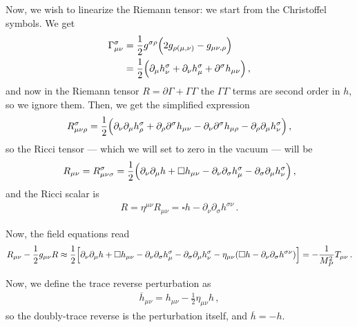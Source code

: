 \documentclass[main.tex]{subfiles}
\begin{document}
Now, we wish to linearize the Riemann tensor: we start from the Christoffel symbols. We get 
%
\begin{subequations}
\begin{align}
\Gamma^{\sigma }_{\mu \nu }
&= \frac{1}{2} g^{\sigma \rho }\qty(2g_{\rho (\mu , \nu )} - g_{\mu \nu , \rho })  \\
&= \frac{1}{2} \qty(\partial_{\mu } h^{\sigma }_{\nu } + \partial_{\nu } h^{\sigma }_{\mu } + \partial^{\sigma } h_{\mu \nu })
\,,
\end{align}
\end{subequations}
%
and now in the Riemann tensor \(R = \partial \Gamma + \Gamma \Gamma \) the \(\Gamma \Gamma \) terms are second order in \(h\), so we ignore them. Then, we get the simplified expression 
%
\begin{align}
R^{\sigma }_{\mu \nu \rho } = \frac{1}{2} 
\qty(\partial_{\nu } \partial_{\mu } 
h^{\sigma }_{\rho } 
+ \partial_{\rho } \partial^{\sigma }h_{\mu \nu }
- \partial_{\nu } \partial^{\sigma } h_{\mu \rho }
- \partial_{\rho } \partial_{\mu } h^{\sigma }_{\nu })
\,,
\end{align}
%
so the Ricci tensor --- which we will  set to zero in the vacuum --- will be 
%
\begin{align}
R_{\mu \nu }
= R^{\sigma }_{\mu \nu \sigma }
= \frac{1}{2} 
\qty(\partial_{\nu } \partial_{\mu } h + \square h_{\mu \nu } 
- \partial_{\nu } \partial_{\sigma } h^{\sigma }_{\mu }
- \partial_{\sigma} \partial_{\mu } h^{\sigma }_{\nu })
\,,
\end{align}
%
and the Ricci scalar is 
%
\begin{align}
R = \eta^{\mu \nu } R_{\mu \nu } 
= \square h - \partial_{\nu }\partial_{\sigma } h^{\sigma \nu }
\,.
\end{align}

Now, the field equations read 
%
\begin{align}
R_{\mu \nu } - \frac{1}{2} g_{\mu \nu } R 
\approx \frac{1}{2} \qty[
  \partial_{\nu } \partial_{\mu } h + \square h_{\mu \nu } 
  - \partial_{\nu } \partial_{\sigma } h^{\sigma }_{\mu }
  - \partial_{\sigma} \partial_{\mu } h^{\sigma }_{\nu }
  - \eta_{\mu \nu }
  \qty(\square h - \partial_{\nu }\partial_{\sigma } h^{\sigma \nu })
] = - \frac{1}{M_P^2} T_{\mu \nu }
\,.
\end{align}

Now, we define the trace reverse perturbation as 
%
\begin{align}
\overline{h}_{\mu \nu } = h_{\mu \nu } - \frac{1}{2} \eta_{\mu \nu } h  
\,,
\end{align}
%
so the doubly-trace reverse is the perturbation itself, and \(\overline{h} = - h\). 
\end{document}
